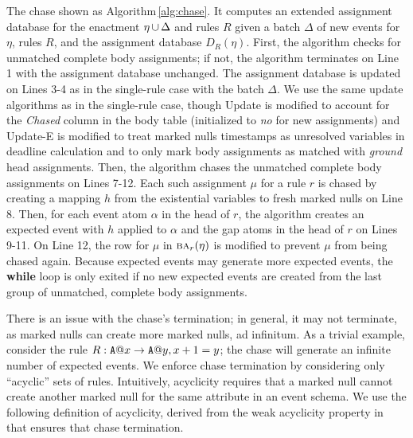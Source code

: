 The chase shown as Algorithm\,\ref{alg:chase}.
It computes an extended assignment database for
the enactment $\eta\,{\cup}\,\Delta$ and rules $R$
given a batch $\Delta$ of new events for $\eta$,
rules $R$, and
the assignment database $D_{R}(\eta)$.
First, the algorithm checks for unmatched complete body assignments;
if not, the algorithm terminates on Line 1
with the assignment database unchanged.
The assignment database is updated on Lines 3-4
as in the single-rule case with the batch $\Delta$.
We use the same update algorithms as in the single-rule case,
though {\sf Update} is modified
to account for the {\it Chased} column in the body table
(initialized to {\em no} for new assignments)
and {\sf Update-E} is modified
to treat marked nulls timestamps as unresolved variables in deadline calculation
and to only mark body assignments as matched
with {\it ground} head assignments.
Then, the algorithm chases the unmatched complete body assignments
on Lines 7-12.
Each such assignment $\mu$ for a rule $r$
is chased by creating a mapping $h$ from the existential variables
to fresh marked nulls
on Line 8.
Then,
for each event atom $\alpha$ in the head of $r$,
the algorithm creates an expected event with $h$
applied to $\alpha$ and the gap atoms in the head of $r$
on Lines 9-11.
On Line 12, the row for $\mu$ in $\BODY/_r(\eta)$
is modified to prevent
$\mu$ from being chased again.
Because expected events may generate more expected events,
the {\bf while} loop is only exited
if no new expected events are created
from the last group of unmatched, complete body assignments.

There is an issue with the chase's termination;
in general, it may not terminate,
as marked nulls can create more marked nulls, ad infinitum.
As a trivial example,
consider the rule $R:\mbox{\tt A}@x\rightarrow\mbox{\tt A}@y, x+1=y$;
the chase will generate an infinite number of expected events.
We enforce chase termination
by considering only ``acyclic'' sets of rules.
Intuitively, acyclicity requires that a marked null
cannot create another marked null for the same attribute in an event schema.
We use the following definition of acyclicity,
derived from the weak acyclicity property in \cite{fagin2005data}that ensures that chase termination.

